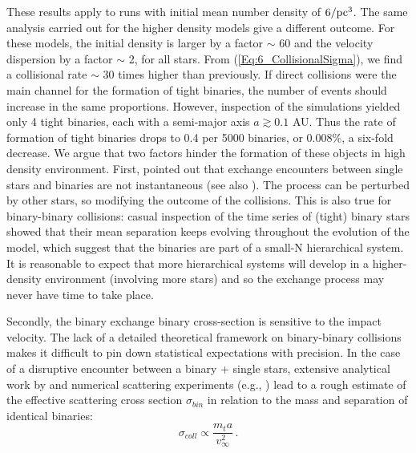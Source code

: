  These results apply to runs with initial mean number density of $6 / {\textrm{pc}}^3$.  The same analysis carried out for the higher 
 density models give a different outcome. 
For these models, the initial density is larger by a factor $\sim$ 60 and the velocity dispersion  by a factor $\sim$ 2, 
for all stars. From (\ref{Eq:6_CollisionalSigma}),  we find a collisional rate  $\sim$ 30 times higher than previously. 
If direct collisions were 
the main channel for the formation of tight binaries, the number of events should  increase in the same proportions.
However, inspection of the simulations yielded only 4 tight binaries, each  with a semi-major axis $a \gtrsim 0.1$ AU. 
 Thus the rate of formation of tight binaries drops to 0.4 per 5000 binaries, or 0.008\%, a six-fold decrease. 
We argue that two factors hinder the formation of these objects in high density environment. First, \cite{Geller2015} pointed out  that exchange encounters between single stars and binaries are not instantaneous (see also \citealt{Hut 1983}). 
 The process can be perturbed by other stars, so modifying the outcome of the collisions. This is also true for binary-binary collisions: casual inspection of the time series of (tight) binary stars showed that their mean separation keeps evolving 
 throughout the evolution of the model, which suggest that the binaries are part of a small-N hierarchical system. 
  It is reasonable to  expect that more hierarchical systems will develop in a higher-density environment (involving more stars) 
  and so the exchange process may never have time to take place.

Secondly, the binary exchange binary cross-section is sensitive to the impact velocity. The lack of a detailed theoretical framework on binary-binary collisions makes it difficult to pin down statistical expectations with precision. In the case of a disruptive encounter between a binary + single stars, extensive 
analytical work by \cite{Mikkola1983,Mikkola1984a,Mikkola1984b} and numerical scattering experiments (e.g., \citealt{Heggie1996,Fregeau2004})  %
lead to a rough estimate of the effective scattering cross section $\sigma_{bin}$ in relation to the mass and separation of identical binaries: %
\begin{equation}
\sigma_{coll} \propto \frac{m_t a}{v_\infty^2}\, . 
\label{Eq:6_CollisionalSigma} 
\end{equation}

